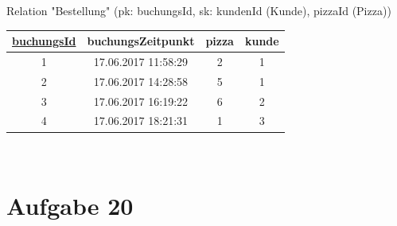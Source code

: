 Relation "Bestellung" (pk: buchungsId, sk: kundenId (Kunde), pizzaId (Pizza))\\
\begin{tabular} {|c|c|c|c|}
	\rowcolor{Gray}\hline
	\underline{buchungsId}&buchungsZeitpunkt \phantom{a}&pizza&kunde\\\hline
	1&17.06.2017 11:58:29&2&1\\\hline
	2&17.06.2017 14:28:58&5&1\\\hline
	3&17.06.2017 16:19:22&6&2\\\hline
	4&17.06.2017 18:21:31&1&3\\\hline
\end{tabular}\\
\pagebreak

\pagebreak

\pagebreak

\pagebreak
\section*{Aufgabe 20}

